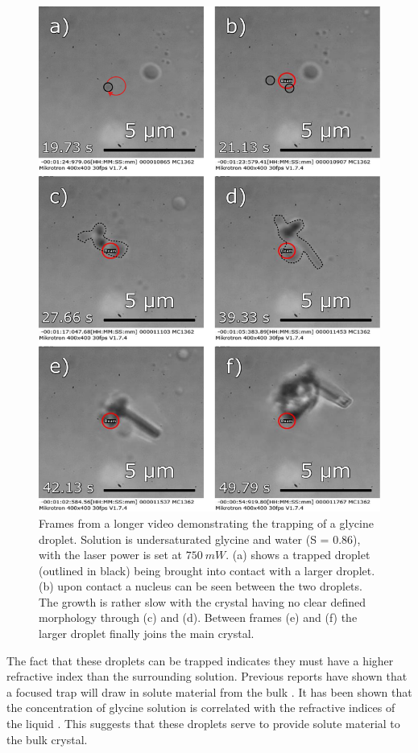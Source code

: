 \begin{figure}[h!]
	\centering
	\includegraphics[width=0.8\linewidth]{cluster_trapping.pdf}
	\caption{Frames from a longer video demonstrating the trapping of a glycine 
		droplet. Solution is undersaturated glycine and water (S = 0.86), with the 
		laser power is set at $750\ mW$. (a) shows a trapped droplet (outlined in 
		black) being brought into contact with a larger droplet. (b) upon contact 
		a nucleus can be seen between the two droplets. The growth is rather slow 
		with the crystal having no clear defined morphology through (c) and (d). 
		Between frames (e) and (f) the larger droplet finally joins the main crystal.}
	\label{fig:cluster_trapping}
\end{figure}

The fact that these droplets can be trapped indicates they must 
have a higher refractive index than the surrounding solution. 
Previous reports have shown that a focused trap will draw in 
solute material from the bulk \cite{Tsuboi2009, Gowayed2021}. It 
has been shown that the concentration of glycine solution is correlated 
with the refractive indices of the liquid \cite{Gowayed2021, Orttung1963}. 
This suggests that these droplets serve to provide solute material 
to the bulk crystal. 

